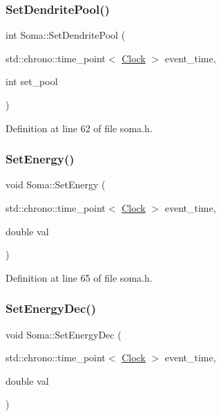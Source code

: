 \subsubsection{\texorpdfstring{Set\+Dendrite\+Pool()}{SetDendritePool()}}
{\footnotesize\ttfamily int Soma\+::\+Set\+Dendrite\+Pool (\begin{DoxyParamCaption}\item[{std\+::chrono\+::time\+\_\+point$<$ \hyperlink{universe_8h_a0ef8d951d1ca5ab3cfaf7ab4c7a6fd80}{Clock} $>$}]{event\+\_\+time,  }\item[{int}]{set\+\_\+pool }\end{DoxyParamCaption})\hspace{0.3cm}{\ttfamily [inline]}}



Definition at line 62 of file soma.\+h.

\mbox{\label{class_soma_a0d1c0271fc8eeacd6e8836f751dff331}} 
\subsubsection{\texorpdfstring{Set\+Energy()}{SetEnergy()}}
{\footnotesize\ttfamily void Soma\+::\+Set\+Energy (\begin{DoxyParamCaption}\item[{std\+::chrono\+::time\+\_\+point$<$ \hyperlink{universe_8h_a0ef8d951d1ca5ab3cfaf7ab4c7a6fd80}{Clock} $>$}]{event\+\_\+time,  }\item[{double}]{val }\end{DoxyParamCaption})\hspace{0.3cm}{\ttfamily [inline]}}



Definition at line 65 of file soma.\+h.

\mbox{\label{class_soma_a37081f7a8fc7832f8e89629221ddb8a6}} 
\subsubsection{\texorpdfstring{Set\+Energy\+Dec()}{SetEnergyDec()}}
{\footnotesize\ttfamily void Soma\+::\+Set\+Energy\+Dec (\begin{DoxyParamCaption}\item[{std\+::chrono\+::time\+\_\+point$<$ \hyperlink{universe_8h_a0ef8d951d1ca5ab3cfaf7ab4c7a6fd80}{Clock} $>$}]{event\+\_\+time,  }\item[{double}]{val }\end{DoxyParamCaption})\hspace{0.3cm}{\ttfamily [inline]}}



